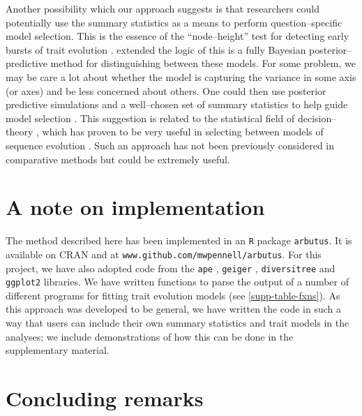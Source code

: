 \documentclass[a4paper,12pt]{article}
\begin{document}
Another possibility which our approach suggests is that researchers could potentially use the summary statistics as a means to perform question--specific model selection. This is the essence of the ``node--height'' test for detecting early bursts of trait evolution \citep{FreckletonHarvey2006}. \citet{SlaterPennell} extended the logic of this is a fully Bayesian posterior--predictive method for distinguishing between these models. For some problem, we may be care a lot about whether the model is capturing the variance in some axis (or axes) and be less concerned about others. One could then use posterior predictive simulations and a well--chosen set of summary statistics to help guide model selection \citep[see][]{Bollback2002, Lewis2013}. This suggestion is related to the statistical field of decision--theory \citep{ Robert2007}, which has proven to be very useful in selecting between models of sequence evolution \citep{Minin2003, SullivanJoyce2005}. Such an approach has not been previously considered in comparative methods but could be extremely useful.

\section*{A note on implementation}

The method described here has been implemented in an \texttt{R} package \texttt{arbutus}. It is available on CRAN and at \texttt{www.github.com/mwpennell/arbutus}. For this project, we have also adopted code from the \texttt{ape} \citep{ape}, \texttt{geiger} \citep{geiger}, \texttt{diversitree} \citep{FitzJohn2012} and \texttt{ggplot2} \citep{ggplot2} libraries. We have written functions to parse the output of a number of different programs for fitting trait evolution models (see \ref{supp-table-fxns}). As this approach was developed to be general, we have written the code in such a way that users can include their own summary statistics and trait models in the analyses; we include demonstrations of how this can be done in the supplementary material.

\section*{Concluding remarks}
\end{document}
